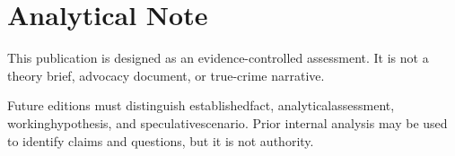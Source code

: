 \chapter*{Analytical Note}

This publication is designed as an evidence-controlled assessment. It is not a theory brief, advocacy document, or true-crime narrative.

Future editions must distinguish \gls{establishedfact}, \gls{analyticalassessment}, \gls{workinghypothesis}, and \gls{speculativescenario}. Prior internal analysis may be used to identify claims and questions, but it is not authority.

\nocite{project-foundation}

